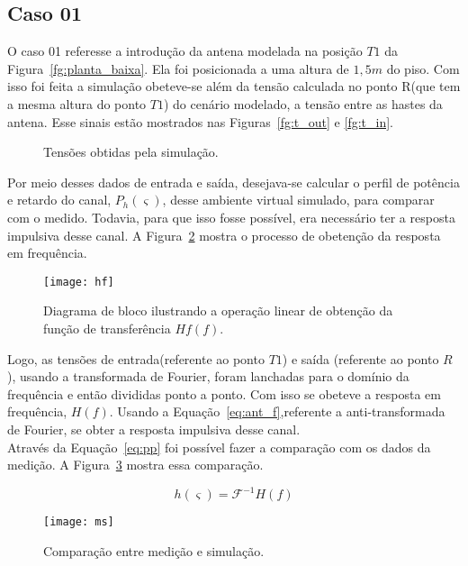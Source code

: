 \subsection{Caso 01}
O caso 01 referesse a introdução da antena modelada na posição $T1$ da Figura~\ref{fg:planta_baixa}. Ela foi posicionada a uma altura de $1,5m$ do piso. Com isso foi feita a simulação obeteve-se além da tensão calculada no ponto R(que tem a mesma altura do ponto $T1$) do cenário modelado, a tensão entre as hastes da antena. Esse sinais estão mostrados nas Figuras~\ref{fg:t_out} e \ref{fg:t_in}.

\begin{figure}[ht!]
	\begin{center}
\qquad
	\end{center}
	\caption{Tensões obtidas pela simulação.}
	\label{fg:tensoes}
\end{figure}

Por meio desses dados de entrada e saída, desejava-se calcular o perfil de potência e retardo do canal, $ P_h(\varsigma)$, desse ambiente virtual simulado, para comparar com o medido. Todavia, para que isso fosse possível, era necessário ter a resposta impulsiva desse canal. A Figura~\ref{fg:hf} mostra o processo de obetenção da resposta em frequência.\\
\begin{figure}[ht!]
	\centering
	\texttt{[image: hf]}
	\caption{Diagrama de bloco ilustrando a operação linear de obtenção da função de transferência $Hf(f)$.}
	\label{fg:hf}
\end{figure}

Logo, as tensões de entrada(referente ao ponto $T1$) e saída (referente ao ponto $R$), usando a transformada de Fourier, foram lanchadas para o domínio da frequência e então divididas ponto a ponto. Com isso se obeteve a resposta em frequência, $H( f )$. Usando a Equação~\ref{eq:ant_f},referente a anti-transformada de Fourier, se obter a resposta impulsiva desse canal.\\


Através da Equação~\ref{eq:pp} foi possível fazer a comparação com os dados da medição. A Figura~\ref{fg:ms} mostra essa comparação.

\begin{equation}\label{eq:ant_f}
	h(\varsigma) = \mathcal{F^{-1}}{H(f)}
\end{equation}

\begin{figure}[ht!]
	\centering
	\texttt{[image: ms]}
	\caption{Comparação entre medição e simulação.}
	\label{fg:ms}
\end{figure}
